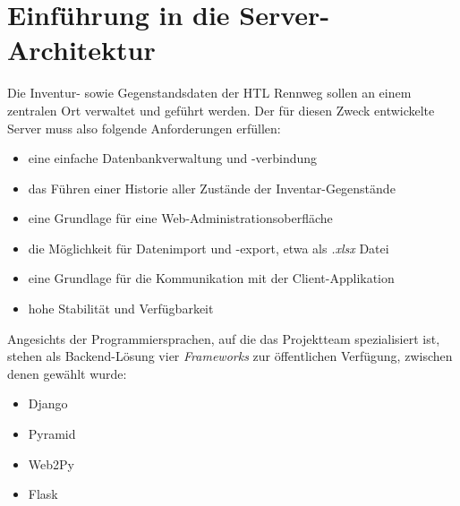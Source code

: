 \chapter{Einführung in die Server-Architektur}
\label{intro_server}
\renewcommand{\kapitelautor}{Autor: Mathias Möller}

Die Inventur- sowie Gegenstandsdaten der HTL Rennweg sollen an einem
zentralen Ort verwaltet und geführt werden. Der für diesen Zweck
entwickelte Server muss also folgende Anforderungen erfüllen:

\begin{itemize}
\tightlist
\item
  eine einfache Datenbankverwaltung und -verbindung
\item
  das Führen einer Historie aller Zustände der Inventar-Gegenstände
\item
  eine Grundlage für eine Web-Administrationsoberfläche
\item
  die Möglichkeit für Datenimport und -export, etwa als
  \emph{.xlsx}
  Datei
\item
  eine Grundlage für die Kommunikation mit der Client-Applikation
\item
  hohe Stabilität und Verfügbarkeit
\end{itemize}

Angesichts der Programmiersprachen, auf die das Projektteam
spezialisiert ist, stehen als Backend-Lösung vier
\emph{Frameworks}
zur öffentlichen Verfügung, zwischen denen gewählt wurde:

\begin{itemize}
\tightlist
\item
  Django \cite{django}
\item
  Pyramid \cite{pyramid}
\item
  Web2Py \cite{web2py}
\item
  Flask \cite{flask}
\end{itemize}

